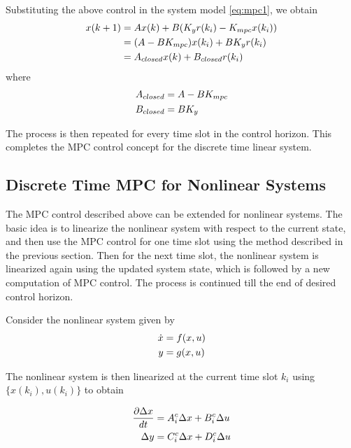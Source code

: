             Substituting the above control in the system model \eqref{eq:mpc1}, we obtain
            \begin{equation}
                \aligned
                    x(k+1) &= A x(k) + B (K_y r(k_i) - K_{mpc} x(k_i))\\
                           &= (A  - B K_{mpc} )x(k_i) + B K_y r(k_i) \\
                           &= A_{closed}x(k) + B_{closed} r(k_i)
                \endaligned
            \end{equation}
            where
            \begin{equation}
                \aligned
                    A_{closed} &= A - B K_{mpc}\\
                    B_{closed} &= B K_y
                \endaligned
            \end{equation}
            
            The process is then repeated for every time slot in the control horizon.  This completes the MPC control concept for the discrete time linear system.

        \subsection{Discrete Time MPC for Nonlinear Systems}

            The MPC control described above can be extended for nonlinear systems. The basic idea is to linearize the nonlinear system with respect to the current state, and then use the MPC control for one time slot using the method described in the previous section. Then for the next time slot, the nonlinear system is linearized again using the updated system state, which is followed by a new computation of MPC control. The process is continued till the end of desired control horizon.

            Consider the nonlinear system given by
            \begin{equation}
                \label{eq:non1}
                \aligned
                    \dot{x} &= f(x,u) \\
                    y& =g(x,u)
                \endaligned
            \end{equation}
            
            The nonlinear system is then linearized at the current time slot $k_i$ using $\{x(k_i), u(k_i)\}$ to obtain
            
            \begin{equation}
                \label{eq:non2}
                \aligned
                    \frac{\partial\Delta x}{dt}& = A_i^c \Delta x + B_i^c \Delta u\\
                    \Delta y & = C_i^c \Delta x + D_i^c \Delta u
                \endaligned
            \end{equation}
            
